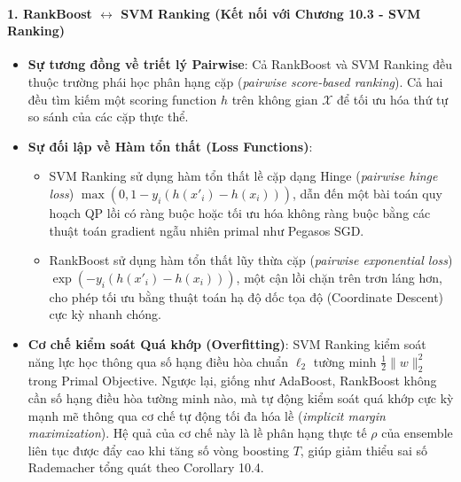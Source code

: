 \paragraph{1. RankBoost $\leftrightarrow$ SVM Ranking (Kết nối với Chương 10.3 - SVM Ranking)}
\begin{itemize}
    \item \textbf{Sự tương đồng về triết lý Pairwise}: Cả RankBoost và SVM Ranking đều thuộc trường phái học phân hạng cặp (\textit{pairwise score-based ranking}). Cả hai đều tìm kiếm một scoring function $h$ trên không gian $\mathcal{X}$ để tối ưu hóa thứ tự so sánh của các cặp thực thể.
    \item \textbf{Sự đối lập về Hàm tổn thất (Loss Functions)}: 
    \begin{itemize}
        \item SVM Ranking sử dụng hàm tổn thất lề cặp dạng Hinge (\textit{pairwise hinge loss}) $\max\left(0, 1 - y_i(h(x'_i) - h(x_i))\right)$, dẫn đến một bài toán quy hoạch QP lồi có ràng buộc hoặc tối ưu hóa không ràng buộc bằng các thuật toán gradient ngẫu nhiên primal như Pegasos SGD.
        \item RankBoost sử dụng hàm tổn thất lũy thừa cặp (\textit{pairwise exponential loss}) $\exp\left(-y_i(h(x'_i) - h(x_i))\right)$, một cận lồi chặn trên trơn láng hơn, cho phép tối ưu bằng thuật toán hạ độ dốc tọa độ (Coordinate Descent) cực kỳ nhanh chóng.
    \end{itemize}
    \item \textbf{Cơ chế kiểm soát Quá khớp (Overfitting)}: SVM Ranking kiểm soát năng lực học thông qua số hạng điều hòa chuẩn $\ell_2$ tường minh $\frac{1}{2}\|w\|^2_2$ trong Primal Objective. Ngược lại, giống như AdaBoost, RankBoost không cần số hạng điều hòa tường minh nào, mà tự động kiểm soát quá khớp cực kỳ mạnh mẽ thông qua cơ chế tự động tối đa hóa lề (\textit{implicit margin maximization}). Hệ quả của cơ chế này là lề phân hạng thực tế $\rho$ của ensemble liên tục được đẩy cao khi tăng số vòng boosting $T$, giúp giảm thiểu sai số Rademacher tổng quát theo Corollary 10.4.
\end{itemize}

